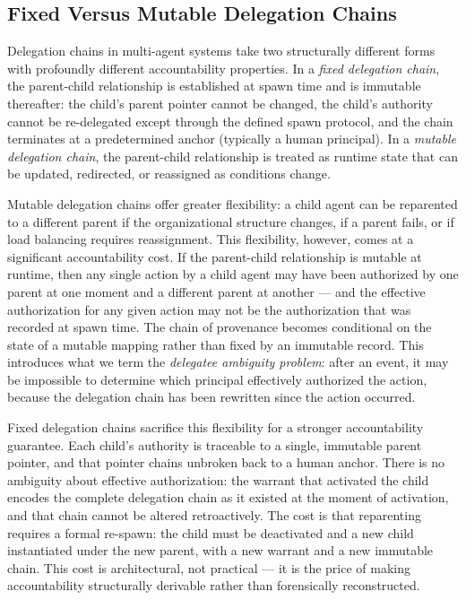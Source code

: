 \subsection{Fixed Versus Mutable Delegation Chains}

Delegation chains in multi-agent systems take two structurally different forms with profoundly different accountability properties. In a \emph{fixed delegation chain}, the parent-child relationship is established at spawn time and is immutable thereafter: the child's parent pointer cannot be changed, the child's authority cannot be re-delegated except through the defined spawn protocol, and the chain terminates at a predetermined anchor (typically a human principal). In a \emph{mutable delegation chain}, the parent-child relationship is treated as runtime state that can be updated, redirected, or reassigned as conditions change.

Mutable delegation chains offer greater flexibility: a child agent can be reparented to a different parent if the organizational structure changes, if a parent fails, or if load balancing requires reassignment. This flexibility, however, comes at a significant accountability cost. If the parent-child relationship is mutable at runtime, then any single action by a child agent may have been authorized by one parent at one moment and a different parent at another — and the effective authorization for any given action may not be the authorization that was recorded at spawn time. The chain of provenance becomes conditional on the state of a mutable mapping rather than fixed by an immutable record. This introduces what we term the \emph{delegatee ambiguity problem}: after an event, it may be impossible to determine which principal effectively authorized the action, because the delegation chain has been rewritten since the action occurred.

Fixed delegation chains sacrifice this flexibility for a stronger accountability guarantee. Each child's authority is traceable to a single, immutable parent pointer, and that pointer chains unbroken back to a human anchor. There is no ambiguity about effective authorization: the warrant that activated the child encodes the complete delegation chain as it existed at the moment of activation, and that chain cannot be altered retroactively. The cost is that reparenting requires a formal re-spawn: the child must be deactivated and a new child instantiated under the new parent, with a new warrant and a new immutable chain. This cost is architectural, not practical — it is the price of making accountability structurally derivable rather than forensically reconstructed.

